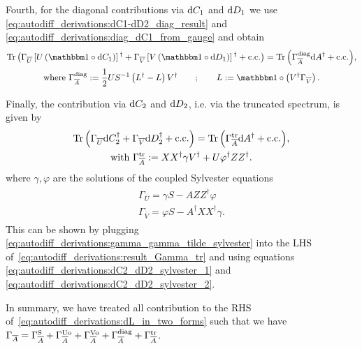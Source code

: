 Fourth, for the diagonal contributions via $\mathrm{d}{C}_1$ and $\mathrm{d}{D}_1$ we use \eqref{eq:autodiff_derivations:dC1-dD2_diag_result} and \eqref{eq:autodiff_derivations:diag_dC1_from_gauge} and obtain
\begin{gather}
    \begin{gathered}
    \tr{\Gconj{U}\sBr{U\rBr{\eye\hadamard\dC_1}}^{\dagger} + \Gconj{V}\sBr{V\rBr{\eye\hadamard\dD_1}}^{\dagger}\pcc}
    = \tr{\GcAd\dA^{\dagger}\pcc}
    \end{gathered}
    ,
    \\
    \text{where } \GcAd := \frac{1}{2} U S^{-1} \rBr{L^{\dagger} - L}V^{\dagger}
    \qquad ; \qquad
    L := \eye\hadamard\rBr{V^{\dagger}\Gconj{V}}
    .
\end{gather}

Finally, the contribution via $\mathrm{d}{C}_2$ and $\mathrm{d}{D}_2$, i.e. via the truncated spectrum, is given by
\begin{gather}
    \label{eq:autodiff_derivations:result_Gamma_tr}
    \begin{gathered}
    \mathrm{Tr}\left( {\Gamma_{\overline{U}}\mathrm{d}{C}_2^{\dagger} + \Gamma_{\overline{V}}\mathrm{d}{D}_2^{\dagger}+ \mathrm{c.c.}} \right) = \mathrm{Tr}\left( {\Gamma_{\overline{A}}^\mathrm{tr}\mathrm{d}{A}^{\dagger}+ \mathrm{c.c.}} \right)
    \end{gathered}
    ,
    \\
    \text{with } \Gamma_{\overline{A}}^\mathrm{tr} := XX^{\dagger}\gamma V^{\dagger} + U\varphi^{\dagger} ZZ^{\dagger}
    .
\end{gather}
where $\gamma, \varphi$ are the solutions of the coupled Sylvester equations
\begin{align}
    \label{eq:autodiff_derivations:gamma_gamma_tilde_sylvester}
    \begin{split}
        \Gamma_{\bar{U}} = \gamma S - A Z Z^\dagger \varphi
        \\
        \Gamma_{\bar{V}} = \varphi S - A^\dagger X X^\dagger \gamma
        .
    \end{split}
\end{align}
%
This can be shown by plugging \eqref{eq:autodiff_derivations:gamma_gamma_tilde_sylvester} into the LHS of~\eqref{eq:autodiff_derivations:result_Gamma_tr} and using equations \eqref{eq:autodiff_derivations:dC2_dD2_sylvester_1} and \eqref{eq:autodiff_derivations:dC2_dD2_sylvester_2}.


In summary, we have treated all contribution to the RHS of~\eqref{eq:autodiff_derivations:dL_in_two_forms} such that we have $\Gamma_{\overline{A}} = \Gamma_{\overline{A}}^\mathrm{S} + \Gamma_{\overline{A}}^\mathrm{Uo} + \Gamma_{\overline{A}}^\mathrm{Vo} + \Gamma_{\overline{A}}^\mathrm{diag} + \Gamma_{\overline{A}}^\mathrm{tr}$.


